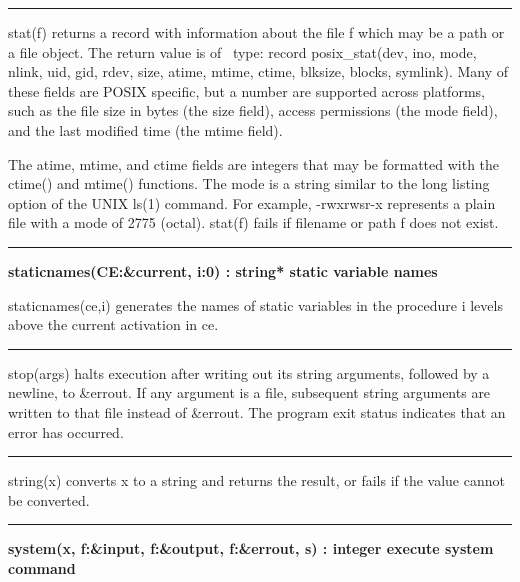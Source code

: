 \bigskip\hrule\vspace{0.1cm}

\noindent
{}\textsf{stat(f)} returns a record
with information about the file \textsf{f} which may be a path or a
file object. The return value is of \ type: \textsf{record
posix\_stat(dev, ino, mode, nlink, uid, gid, rdev, size, atime, mtime,
ctime, blksize, blocks, symlink)}. Many of these fields are POSIX
specific, but a number are supported across platforms, such as the
file size in bytes (the \textsf{size} field), access
permissions (the \textsf{mode} field), and the last modified time (the
\textsf{mtime} field).

The \textsf{atime}, \textsf{mtime}, and \textsf{ctime} fields are
integers that may be formatted with the \textsf{ctime()} and
\textsf{mtime()} functions. The mode is a string similar to the long
listing option of the UNIX \textsf{ls(1)} command. For example,
\textsf{{\textquotedbl}-rwxrwsr-x{\textquotedbl}} represents a plain
file with a mode of 2775 (octal). \textsf{stat(f)} fails if filename or
path \textsf{f} does not exist.

\bigskip\hrule\vspace{0.1cm}
\noindent
{\bf staticnames(CE:\&current, i:0) : string* \hfill static variable names}

\noindent
{}\textsf{staticnames(ce,i)} generates the names of static
variables in the procedure \textsf{i} levels above the current
activation in \textsf{ce}.

\bigskip\hrule\vspace{0.1cm}

\noindent
{}\textsf{stop(args)} halts execution after
writing out its string arguments, followed by a newline, to
\textsf{\&errout}. If any argument is a file, subsequent string
arguments are written to that file instead of \textsf{\&errout}. The
program exit status indicates that an error has occurred.

\bigskip\hrule\vspace{0.1cm}

\noindent
{}\textsf{string(x)} converts x
to a string and returns the result, or fails if the value cannot be
converted.

\bigskip\hrule\vspace{0.1cm}
\noindent
{\bf system(x, f:\&input, f:\&output, f:\&errout, s) : integer \hfill 
execute system command}

